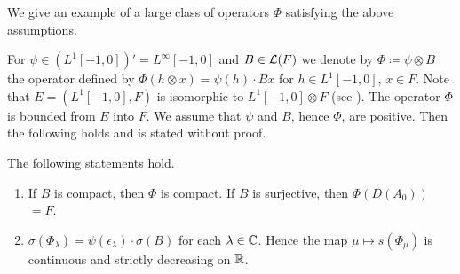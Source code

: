 \begin{example}\label{ex:c4-3.9}
%
%
We give an example of a large class of operators $\Phi$ satisfying the above assumptions.

For $\psi \in (L^{1}[-1,0])' = L^{\infty}[-1,0]$ and $B \in \mathcal{L}(F)$ we denote by $\Phi \coloneqq \psi \otimes B$ the operator defined by $\Phi(h \otimes x) = \psi(h) \cdot Bx$ for $h \in L^{1}[-1,0]$, $x \in F$.
Note that $E = (L^{1}[-1,0],F)$ is isomorphic to $L^{1}[-1,0] \otimes F$ (see \citet[Chapter III,6.5]{schaefer:1966}).
The operator $\Phi$ is bounded from $E$ into $F$.
We assume that $\psi$ and $B$, hence $\Phi$, are positive.
Then the following holds and is stated without proof.

\begin{lemma*}\label{lem:c4-3.9-kgk}
%
The following statements hold.
\begin{enumerate}[\upshape (i), wide,labelindent=.5em] 
\item \label{lem:c4-3.9-kgk.1}
If $B$ is compact, then $\Phi$ is compact. 
If $B$ is surjective, then $\Phi(D(A_{0}))$ $= F$.

\item \label{lem:c4-3.9-kgk.2}
$\sigma(\Phi_{\lambda}) = \psi(\epsilon_{\lambda}) \cdot \sigma(B)$ for each $\lambda \in \mathbb{C}$. 
Hence the map $\mu \mapsto s(\Phi_{\mu})$ is continuous and strictly decreasing on $\mathbb{R}$.
\end{enumerate}
\end{lemma*}
\end{example}

